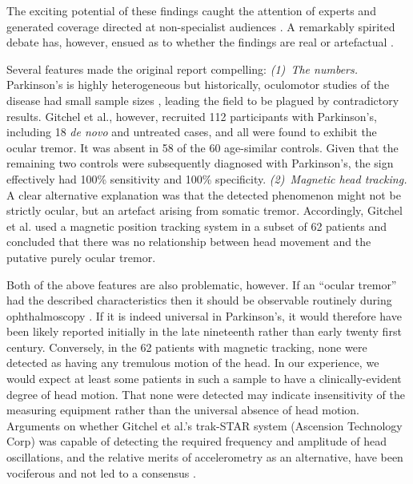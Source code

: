\documentclass[jou,a4paper]{apa6}
\begin{document}
The exciting potential of these findings caught the attention of experts \citep{Leigh2013Tremor-of-the-e, Willard2014Ocular-motor-di, Bronstein2014EYEE:-exciting-} and generated coverage directed at non-specialist audiences \citep{In-Brief2012Ocular-Tremor-i,Phend2012Eye-tremors-may}. A remarkably spirited debate has, however, ensued as to whether the findings are real \citep{Baron2013Ocular-tremor-i,Baron2014Scientific-data,Duval2013Ocular-tremor-i,Gitchel2014Experimental-su} or artefactual \citep{Kaski2013Eye-oscillation,Kaski2013Ocular-tremor-i,MacAskill2013Ocular-tremor-i,Saifee2014Tremor-of-the-e}. 

Several features made the original report compelling: \textit{(1)~The numbers.} Parkinson's is highly heterogeneous but historically, oculomotor studies of the disease had small sample sizes \citep{Anderson2013Eye-movements-i}, leading the field to be plagued by contradictory results.  Gitchel et al., however, recruited 112 participants with Parkinson's, including 18 \textit{de novo} and untreated cases, and all were found to exhibit the ocular tremor. It was absent in 58 of the 60 age-similar controls. Given that the remaining two controls were subsequently diagnosed with Parkinson's, the sign effectively had 100\% sensitivity and 100\% specificity. \textit{(2)~Magnetic head tracking.} A clear alternative explanation was that the detected phenomenon might not be strictly ocular, but an artefact arising from somatic tremor. Accordingly, Gitchel et al. used a magnetic position tracking system in a subset of 62 patients and concluded that there was no relationship between head movement and the putative purely ocular tremor.

Both of the above features are also problematic, however. If an ``ocular tremor'' had the described characteristics then it should be observable routinely during ophthalmoscopy \citep{Leigh2013Tremor-of-the-e}. If it is indeed universal in Parkinson's, it would therefore have been likely reported initially in the late nineteenth rather than early twenty first century. Conversely, in the 62 patients with magnetic tracking, none were detected as having any tremulous motion of the head. In our experience, we would expect at least some patients in such a sample to have a clinically-evident degree of head motion. That none were detected may indicate insensitivity of the measuring equipment rather than the universal absence of head motion. Arguments on whether Gitchel et al.'s trak-STAR system (Ascension Technology Corp) was capable of detecting the required frequency and amplitude of head oscillations, and the relative merits of accelerometry as an alternative, have been vociferous and not led to a consensus \citep{MacAskill2013Ocular-tremor-i,Saifee2014Tremor-of-the-e,Kaski2013Eye-oscillation,Baron2013Ocular-tremor-i,Baron2014Scientific-data,Gitchel2014Experimental-su}. 
\end{document}
